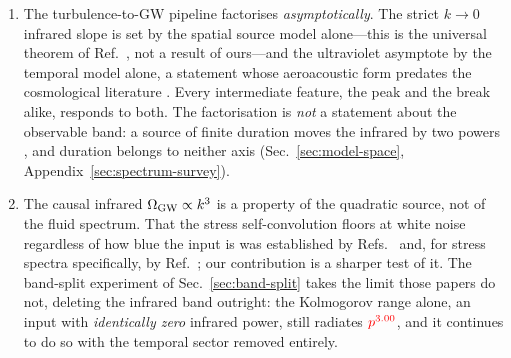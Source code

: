 \documentclass[10pt,prd,aps,nobibnotes,superscriptaddress,preprintnumbers,notitlepage]{revtex4-1}
\newcommand{\add}[1]{{\color{red}#1}}
\newcommand{\add}[1]{#1}
\begin{document}
\begin{enumerate}\itemsep2pt
  \item The turbulence-to-GW pipeline factorises \emph{asymptotically}. The strict
  $k\to0$ infrared slope is set by the spatial source model alone---this is the
  universal theorem of Ref.~\cite{Cai:2019cdl}, not a result of ours---and the
  ultraviolet asymptote by the temporal model alone, a statement whose aeroacoustic
  form predates the cosmological literature \cite{Zhou:1996,Rubinstein:2000}. Every
  intermediate feature, the peak and the break alike, responds to both. The
  factorisation is \emph{not} a statement about the observable band: a source of
  finite duration moves the infrared by two powers
  \cite{RoperPol:2022iel,RoperPol:2023dzg}, and duration belongs to neither axis
  (Sec.~\ref{sec:model-space}, Appendix~\ref{sec:spectrum-survey}).

  \item The causal infrared $\Omega_{\rm GW}\propto k^{3}$ is a property of the
  quadratic source, not of the fluid spectrum. That the stress self-convolution
  floors at white noise regardless of how blue the input is was established by
  Refs.~\cite{Caprini:2006jb,Caprini:2009fx} and, for stress spectra specifically,
  by Ref.~\cite{Brandenburg:2019uzj}; our contribution is a sharper test of it. The
  band-split experiment of Sec.~\ref{sec:band-split} takes the limit those papers do
  not, deleting the infrared band outright: the Kolmogorov range alone, an input
  with \emph{identically zero} infrared power, still radiates $\add{p^{3.00}}$, and it
  continues to do so with the temporal sector removed entirely.


\end{enumerate}
\end{document}
